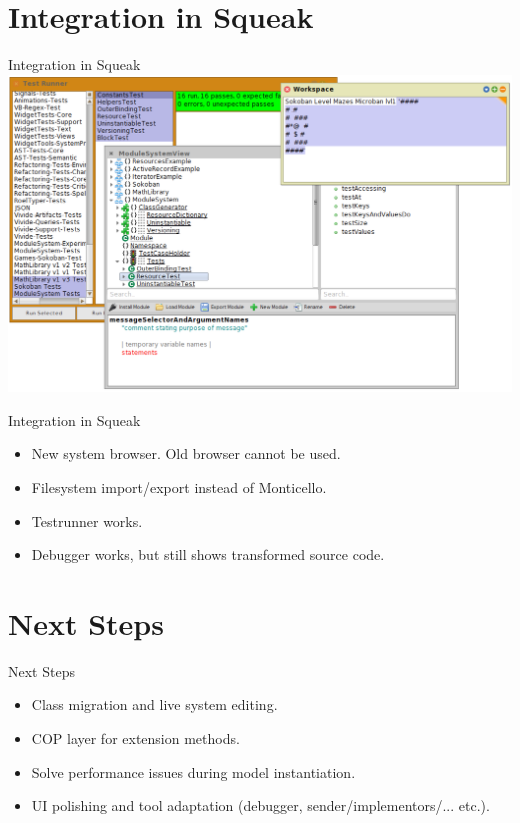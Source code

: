 \documentclass[xcolor=dvipsname, handout]{beamer} %
\begin{document}
\section{Integration in Squeak}
\begin{frame}{Integration in Squeak}
  \centering
  \includegraphics[width=\textwidth]{screenshot_integration.png}
\end{frame}

\begin{frame}{Integration in Squeak}
\begin{itemize}
  \item New system browser. Old browser cannot be used.
  \item Filesystem import/export instead of Monticello.
  \item Testrunner works.
  \item Debugger works, but still shows transformed source code.
\end{itemize}
\end{frame}

\section{Next Steps}
\begin{frame}{Next Steps}
  \begin{itemize}
    \item Class migration and live system editing.
    \item COP layer for extension methods.
    \item Solve performance issues during model instantiation.
    \item UI polishing and tool adaptation (debugger, sender/implementors/... etc.).
  \end{itemize}
\end{frame}
\end{document}
